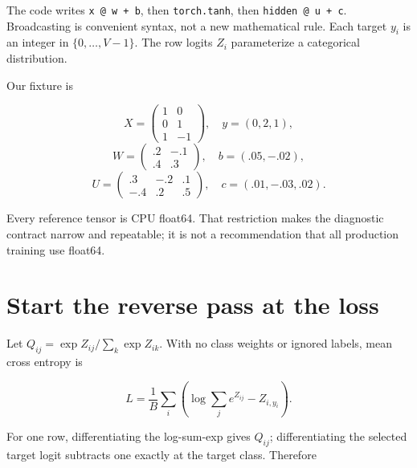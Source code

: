 The code writes \texttt{x\ @\ w\ +\ b}, then \texttt{torch.tanh}, then
\texttt{hidden\ @\ u\ +\ c}. Broadcasting is convenient syntax, not a
new mathematical rule. Each target \(y_i\) is an integer in
\(\{0,\ldots,V-1\}\). The row logits \(Z_i\) parameterize a categorical
distribution.


Our fixture is

\begin{equation}
X=\begin{pmatrix}1&0\\0&1\\1&-1\end{pmatrix},\quad y=(0,2,1),
\end{equation} \begin{equation}
W=\begin{pmatrix}.2&-.1\\.4&.3\end{pmatrix},\quad b=(.05,-.02),
\end{equation} \begin{equation}
U=\begin{pmatrix}.3&-.2&.1\\-.4&.2&.5\end{pmatrix},\quad c=(.01,-.03,.02).
\end{equation}

Every reference tensor is CPU float64. That restriction makes the
diagnostic contract narrow and repeatable; it is not a recommendation
that all production training use float64.

\section{Start the reverse pass at the
loss}\label{start-the-reverse-pass-at-the-loss}

Let \(Q_{ij}=\exp Z_{ij}/\sum_k\exp Z_{ik}\). With no class weights or
ignored labels, mean cross entropy is

\begin{equation}
L=\frac1B\sum_i\left(\log\sum_j e^{Z_{ij}}-Z_{i,y_i}\right).
\end{equation}

For one row, differentiating the log-sum-exp gives \(Q_{ij}\);
differentiating the selected target logit subtracts one exactly at the
target class. Therefore

